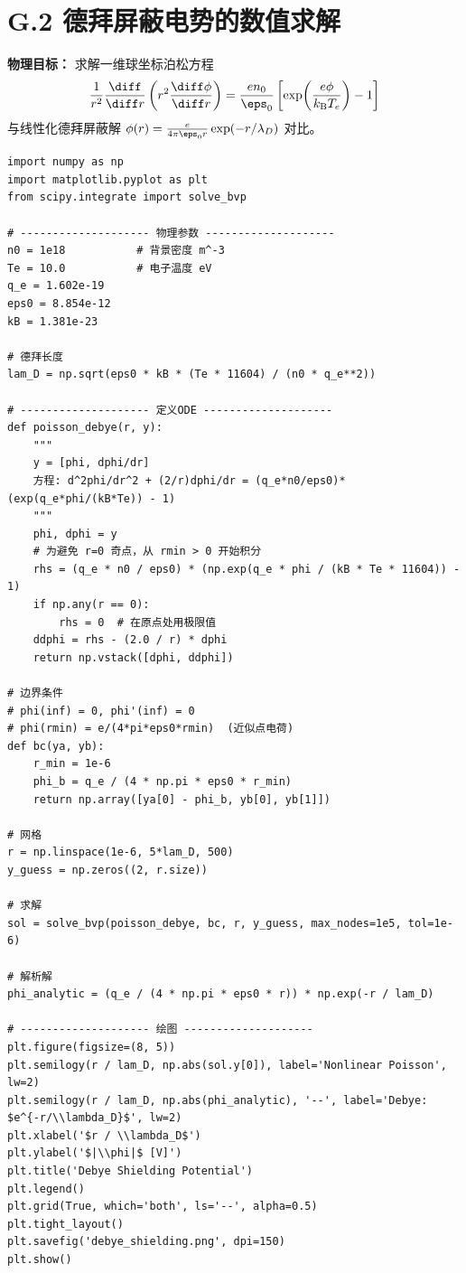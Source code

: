 \section{G.2 德拜屏蔽电势的数值求解}

\textbf{物理目标：} 求解一维球坐标泊松方程
\begin{equation}
\frac{1}{r^2}\frac{\diff}{\diff r}\left(r^2\frac{\diff\phi}{\diff r}\right) = \frac{e n_0}{\eps_0}\left[\exp\!\left(\frac{e\phi}{k_\mathrm{B}T_e}\right)-1\right]
\end{equation}
与线性化德拜屏蔽解 $\phi(r)=\frac{e}{4\pi\eps_0 r}\exp(-r/\lambda_D)$ 对比。

\begin{verbatim}
import numpy as np
import matplotlib.pyplot as plt
from scipy.integrate import solve_bvp

# -------------------- 物理参数 --------------------
n0 = 1e18           # 背景密度 m^-3
Te = 10.0           # 电子温度 eV
q_e = 1.602e-19
eps0 = 8.854e-12
kB = 1.381e-23

# 德拜长度
lam_D = np.sqrt(eps0 * kB * (Te * 11604) / (n0 * q_e**2))

# -------------------- 定义ODE --------------------
def poisson_debye(r, y):
    """
    y = [phi, dphi/dr]
    方程: d^2phi/dr^2 + (2/r)dphi/dr = (q_e*n0/eps0)*(exp(q_e*phi/(kB*Te)) - 1)
    """
    phi, dphi = y
    # 为避免 r=0 奇点，从 rmin > 0 开始积分
    rhs = (q_e * n0 / eps0) * (np.exp(q_e * phi / (kB * Te * 11604)) - 1)
    if np.any(r == 0):
        rhs = 0  # 在原点处用极限值
    ddphi = rhs - (2.0 / r) * dphi
    return np.vstack([dphi, ddphi])

# 边界条件
# phi(inf) = 0, phi'(inf) = 0
# phi(rmin) = e/(4*pi*eps0*rmin)  (近似点电荷)
def bc(ya, yb):
    r_min = 1e-6
    phi_b = q_e / (4 * np.pi * eps0 * r_min)
    return np.array([ya[0] - phi_b, yb[0], yb[1]])

# 网格
r = np.linspace(1e-6, 5*lam_D, 500)
y_guess = np.zeros((2, r.size))

# 求解
sol = solve_bvp(poisson_debye, bc, r, y_guess, max_nodes=1e5, tol=1e-6)

# 解析解
phi_analytic = (q_e / (4 * np.pi * eps0 * r)) * np.exp(-r / lam_D)

# -------------------- 绘图 --------------------
plt.figure(figsize=(8, 5))
plt.semilogy(r / lam_D, np.abs(sol.y[0]), label='Nonlinear Poisson', lw=2)
plt.semilogy(r / lam_D, np.abs(phi_analytic), '--', label='Debye: $e^{-r/\\lambda_D}$', lw=2)
plt.xlabel('$r / \\lambda_D$')
plt.ylabel('$|\\phi|$ [V]')
plt.title('Debye Shielding Potential')
plt.legend()
plt.grid(True, which='both', ls='--', alpha=0.5)
plt.tight_layout()
plt.savefig('debye_shielding.png', dpi=150)
plt.show()
\end{verbatim}


